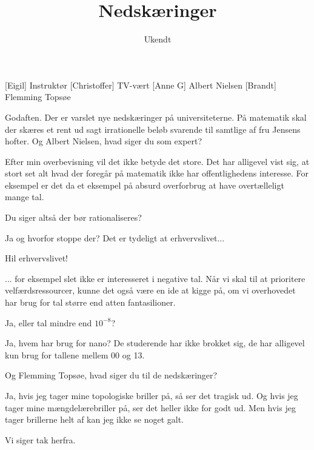 \documentclass[a4paper,11pt]{article}
\title{Nedskæringer}
\author{Ukendt}
\begin{document}
\maketitle

\begin{roles}
[Eigil] Instruktør
[Christoffer] TV-vært
[Anne G] Albert Nielsen
[Brandt] Flemming Topsøe
\end{roles}


\begin{sketch}

 Godaften. Der er varslet nye nedskæringer på universiteterne. På matematik skal der skæres et rent ud sagt irrationelle beløb svarende til samtlige af fru Jensens hofter. Og Albert Nielsen, hvad siger du som expert?

 Efter min overbevisning vil det ikke betyde det store. Det har alligevel vist sig, at stort set alt hvad der foregår på matematik ikke har offentlighedens interesse. For eksempel er det da et eksempel på absurd overforbrug at have overtælleligt mange tal.

 Du siger altså der bør rationaliseres?

 Ja og hvorfor stoppe der? Det er tydeligt at erhvervslivet...

 Hil erhvervslivet!

 ... for eksempel slet ikke er interesseret i negative tal. Når vi skal til at prioritere velfærdsressourcer, kunne det også være en ide at kigge på, om vi overhovedet har brug for tal større end atten fantasilioner.

 Ja, eller tal mindre end $10^{-8}$?

 Ja, hvem har brug for nano? De studerende har ikke brokket sig, de har alligevel kun brug for tallene mellem 00 og 13.

 Og Flemming Topsøe, hvad siger du til de nedskæringer?

 Ja, hvis jeg tager mine topologiske briller på, så ser det tragisk ud. Og hvis jeg tager mine mængdelærebriller på, ser det heller ikke for godt ud. Men hvis jeg tager brillerne helt af kan jeg ikke se noget galt.

 Vi siger tak herfra.

\end{sketch}
\end{document}
